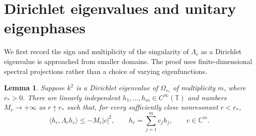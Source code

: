 \documentclass[11pt]{amsart}
\numberwithin{equation}{section}
\newtheorem{lemma}[theorem]{Lemma}
\newcommand{\T}{\mathbb T}
\newcommand{\ip}[2]{\langle #1,#2\rangle}
\begin{document}
\section{Dirichlet eigenvalues and unitary eigenphases}\label{sec:poles}

We first record the sign and multiplicity of the singularity of
$\Lambda_r$ as a Dirichlet eigenvalue is approached from smaller
domains. The proof uses finite-dimensional spectral projections
rather than a choice of varying eigenfunctions.

\begin{lemma}\label{lem:pole}
Suppose $k^2$ is a Dirichlet eigenvalue of $\Omega_{r_*}$ of
multiplicity $m$, where $r_*>0$. There are linearly independent
$h_1,\ldots,h_m\in C^\infty(\T)$ and numbers $M_r\to+\infty$ as
$r\uparrow r_*$ such that, for every sufficiently close nonresonant
$r<r_*$,
\begin{equation}\label{eq:pole}
 \ip{h_c}{\Lambda_rh_c}\le-M_r|c|^2,
 \qquad h_c=\sum_{j=1}^m c_jh_j,\qquad c\in\mathbb C^m.
\end{equation}
\end{lemma}
\end{document}
